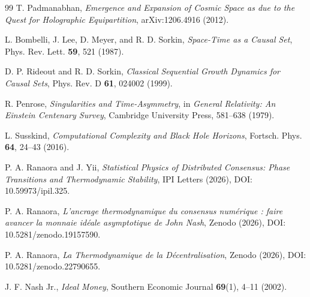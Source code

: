 \documentclass[10pt,twocolumn,a4paper]{article}
\theoremstyle{plain}
\theoremstyle{definition}
\theoremstyle{remark}
\begin{document}
\begin{thebibliography}{99}
T. Padmanabhan, \textit{Emergence and Expansion of Cosmic Space as due to the Quest for Holographic Equipartition}, arXiv:1206.4916 (2012).

L. Bombelli, J. Lee, D. Meyer, and R. D. Sorkin, \textit{Space-Time as a Causal Set}, Phys. Rev. Lett. \textbf{59}, 521 (1987).

D. P. Rideout and R. D. Sorkin, \textit{Classical Sequential Growth Dynamics for Causal Sets}, Phys. Rev. D \textbf{61}, 024002 (1999).

R. Penrose, \textit{Singularities and Time-Asymmetry}, in \textit{General Relativity: An Einstein Centenary Survey}, Cambridge University Press, 581–638 (1979).

L. Susskind, \textit{Computational Complexity and Black Hole Horizons}, Fortsch. Phys. \textbf{64}, 24–43 (2016).

P. A. Ranaora and J. Yii, \textit{Statistical Physics of Distributed Consensus: Phase Transitions and Thermodynamic Stability}, IPI Letters (2026), DOI: 10.59973/ipil.325.

P. A. Ranaora, \textit{L'ancrage thermodynamique du consensus numérique : faire avancer la monnaie idéale asymptotique de John Nash}, Zenodo (2026), DOI: 10.5281/zenodo.19157590.

P. A. Ranaora, \textit{La Thermodynamique de la Décentralisation}, Zenodo (2026), DOI: 10.5281/zenodo.22790655.

J. F. Nash Jr., \textit{Ideal Money}, Southern Economic Journal \textbf{69}(1), 4–11 (2002).

\end{thebibliography}
\end{document}
